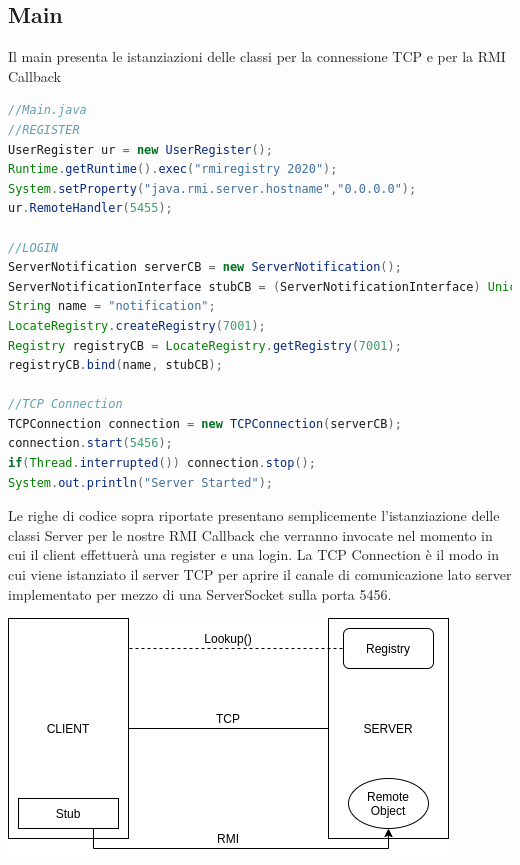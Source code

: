 \documentclass[]{article}
\begin{document}
\subsection{Main}
Il main presenta le istanziazioni delle classi per la connessione TCP e per la RMI Callback
\begin{lstlisting}[language=java]
//Main.java
//REGISTER
UserRegister ur = new UserRegister();
Runtime.getRuntime().exec("rmiregistry 2020");
System.setProperty("java.rmi.server.hostname","0.0.0.0");
ur.RemoteHandler(5455);

//LOGIN
ServerNotification serverCB = new ServerNotification();
ServerNotificationInterface stubCB = (ServerNotificationInterface) UnicastRemoteObject.exportObject(serverCB, 0);
String name = "notification";
LocateRegistry.createRegistry(7001);
Registry registryCB = LocateRegistry.getRegistry(7001);
registryCB.bind(name, stubCB);
	
//TCP Connection
TCPConnection connection = new TCPConnection(serverCB);
connection.start(5456);
if(Thread.interrupted()) connection.stop();
System.out.println("Server Started");
\end{lstlisting}
Le righe di codice sopra riportate presentano semplicemente l'istanziazione delle classi Server per le nostre RMI Callback che verranno invocate nel momento in cui il client effettuerà una register e una login. La TCP Connection è il modo in cui viene istanziato il server TCP per aprire il canale di comunicazione lato server implementato per mezzo di una ServerSocket sulla porta 5456.\\
\begin{center}
\includegraphics[scale=0.6]{classDiagram}
\end{center}
\end{document}

